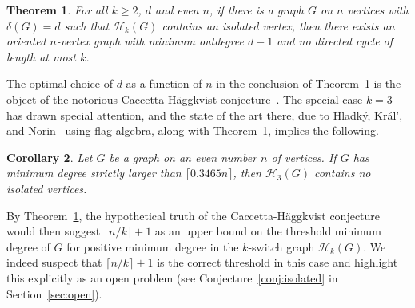 \documentclass[11pt,a4paper]{article}
\newtheorem{theorem}{Theorem}[section]
\newtheorem{corollary}[theorem]{Corollary}
\theoremstyle{definition}
\begin{document}
\begin{theorem}\label{thm:caccettahaggkvistlink}
    For all $k\ge 2$, $d$ and even $n$, if there is a graph $G$ on $n$ vertices with $\delta(G) = d$ such that $\mathcal H_k(G)$ contains an isolated vertex,
    then there exists an oriented $n$-vertex graph with minimum outdegree $d-1$ and no directed cycle of length at most $k$.
\end{theorem}

The optimal choice of $d$ as a function of $n$ in the conclusion of Theorem~\ref{thm:caccettahaggkvistlink} is the object of the notorious Caccetta-Häggkvist conjecture~\cite{caccetta1978Minimal}. The special case $k=3$ has drawn special attention, and the state of the art there, due to Hladký, Král', and Norin~\cite{hladky2017Counting} using flag algebra, along with Theorem~\ref{thm:caccettahaggkvistlink}, implies the following.

\begin{corollary}\label{cor:caccettahaggkvist}
Let $G$ be a graph on an even number $n$ of vertices.
If $G$ has minimum degree strictly larger than $\lceil0.3465 n\rceil$, then $\mathcal H_3(G)$ contains no isolated vertices.
\end{corollary}

By Theorem~\ref{thm:caccettahaggkvistlink}, the hypothetical truth of the Caccetta-Häggkvist conjecture would then suggest $\lceil n/k\rceil +1$ as an upper bound on the threshold minimum degree of $G$ for positive minimum degree in the $k$-switch graph $\mathcal H_k(G)$. We indeed suspect that $\lceil n/k\rceil +1$ is the correct threshold in this case and highlight this explicitly as an open problem (see Conjecture~\ref{conj:isolated} in Section~\ref{sec:open}).
\end{document}
